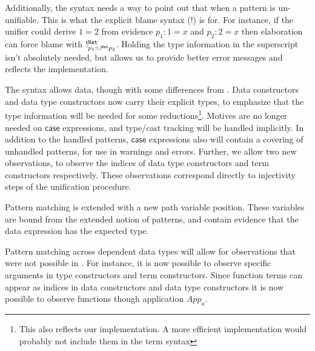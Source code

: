 Additionally, the syntax needs a way to point out that when a pattern is un-unifiable.
This is what the explicit blame syntax ($!$) is for.
For instance, if the unifier could derive $1=2$ from evidence $p_{1}:1=x$ and $p_{2}:2=x$ then elaboration can force blame with $!_{p_{1}:\cup^{\mathtt{Nat}{}}p_{2}}^{\mathtt{Nat}{}}$.
Holding the type information in the superscript isn't absolutely needed, but allows us to provide better error messages and reflects the implementation.
 
The syntax allows data, though with some differences from .
Data constructors and data type constructors now carry their explicit types, to emphasize that the type information will be needed for some reductions\footnote{
  This also reflects our implementation.
  A more efficient implementation would probably not include them in the term syntax}.
Motives are no longer needed on $\mathsf{case}$ expressions, and type/cast tracking will be handled implicitly.
In addition to the handled patterns, $\mathsf{case}$ expressions also will contain a covering of unhandled patterns, for use in warnings and errors.
Further, we allow two new observations, to observe the indices of data type constructors and term constructors respectively.
These observations correspond directly to injectivity steps of the unification procedure.
 
Pattern matching is extended with a new path variable position.
These variables are bound from the extended notion of patterns, and contain evidence that the data expression has the expected type.

Pattern matching across dependent data types will allow for observations that were not possible in .
For instance, it is now possible to observe specific arguments in type constructors and term constructors.
Since function terms can appear as indices in data constructors and data type constructors it is now possible to observe functions though application $App_{a}$.


